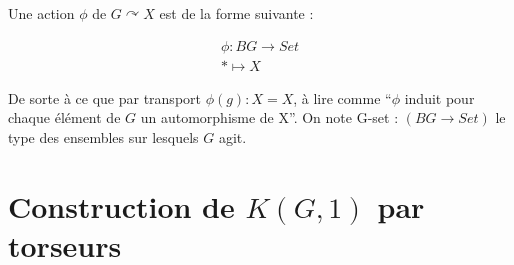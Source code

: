\documentclass{article}
\let\Pr\relax
\DeclareMathOperator{\Pr}{Pr}
\DeclareMathOperator{\shape}{shape}
\newtheorem{definition}{Définition}[section]
\begin{document}
Une action $\phi$ de $G \curvearrowright X$ est de la forme suivante :

\begin{gather*}
  \phi : BG \to Set \\
  * \mapsto X
\end{gather*}

De sorte à ce que par transport $\phi(g) : X = X$, à lire comme ``$\phi$ induit pour chaque élément de $G$ un automorphisme de X''. On note G-set : $(BG \to  Set)$ le type des ensembles sur lesquels $G$ agit.

\section{Construction de $K(G,1)$ par torseurs}








\end{document}
